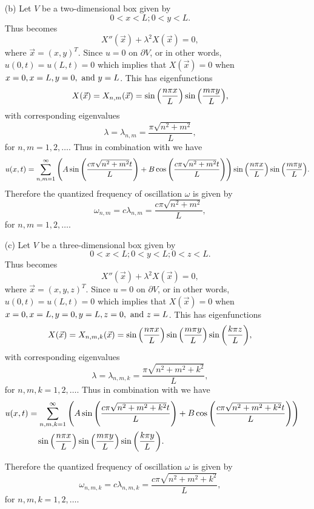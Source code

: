 \documentclass[12pt]{report}
\begin{document}
\begin{solution}
\begin{enumerate}
        \item [(b)]
        Let $V$ be a two-dimensional box given by 
        \[
            0 < x < L; 0 < y < L.
        \]
        Thus  becomes
        \[
            X''(\vec{x}) + \lambda^2 X(\vec{x}) = 0,
        \]
        where $\vec{x} = (x,y)^T$. Since $u = 0$ on $\partial V$, or in other words, $u(0,t) = u(L,t) = 0$ which implies that $X(\vec{x}) = 0$ when $x=0,x=L,y=0,{~\text{and}~} y=L$. This has eigenfunctions
        \[
            X(\vec{x}) = X_{n,m}(\vec{x}) = \sin{\left(\frac{n\pi x}{L}\right)}\sin{\left(\frac{m\pi y}{L}\right)},
        \]
        with corresponding eigenvalues
        \[
            \lambda = \lambda_{n,m} = \frac{\pi\sqrt{n^2 + m^2}}{L},
        \]
        for $n,m=1,2,\dots$. Thus in combination with  we have
        \[
            u(x,t) = \sum_{n,m=1}^\infty {\left(A\sin{\left(\frac{c\pi\sqrt{n^2 + m^2} t}{L}\right)} + B\cos{\left(\frac{c\pi\sqrt{n^2 + m^2} t}{L}\right)}\right)}\sin{\left(\frac{n\pi x}{L}\right)}\sin{\left(\frac{m\pi y}{L}\right)}.
        \]
        Therefore the quantized frequency of oscillation $\omega$ is given by
        \[
            \omega_{n,m} = c \lambda_{n,m} = \frac{c \pi \sqrt{n^2 + m^2}}{L},
        \]
        for $n,m=1,2,\dots$.

        \item [(c)]
        Let $V$ be a three-dimensional box given by 
        \[
            0 < x < L; 0 < y < L; 0 < z < L.
        \]
        Thus  becomes
        \[
            X''(\vec{x}) + \lambda^2 X(\vec{x}) = 0,
        \]
        where $\vec{x} = (x,y,z)^T$. Since $u = 0$ on $\partial V$, or in other words, $u(0,t) = u(L,t) = 0$ which implies that $X(\vec{x}) = 0$ when $x=0,x=L,y=0,y=L,z=0,{~\text{and}~} z=L$. This has eigenfunctions
        \[
            X(\vec{x}) = X_{n,m,k}(\vec{x}) = \sin{\left(\frac{n\pi x}{L}\right)}\sin{\left(\frac{m\pi y}{L}\right)}\sin{\left(\frac{k \pi z}{L}\right)},
        \]
        with corresponding eigenvalues
        \[
            \lambda = \lambda_{n,m,k} = \frac{\pi\sqrt{n^2 + m^2 + k^2}}{L},
        \]
        for $n,m,k=1,2,\dots$. Thus in combination with  we have
        \begin{align*}
            u(x,t) &= \sum_{n,m,k=1}^\infty {\left(A\sin{\left(\frac{c\pi\sqrt{n^2 + m^2 + k^2} t}{L}\right)} + B\cos{\left(\frac{c\pi\sqrt{n^2 + m^2 + k^2} t}{L}\right)}\right)}\\
            &\quad \sin{\left(\frac{n\pi x}{L}\right)}\sin{\left(\frac{m\pi y}{L}\right)}\sin{\left(\frac{k\pi y}{L}\right)}.    
        \end{align*}
        
        Therefore the quantized frequency of oscillation $\omega$ is given by
        \[
            \omega_{n,m,k} = c \lambda_{n,m,k} = \frac{c \pi \sqrt{n^2 + m^2 + k^2}}{L},
        \]
        for $n,m,k=1,2,\dots$.
    
    \end{enumerate}






\end{solution}
\end{document}
